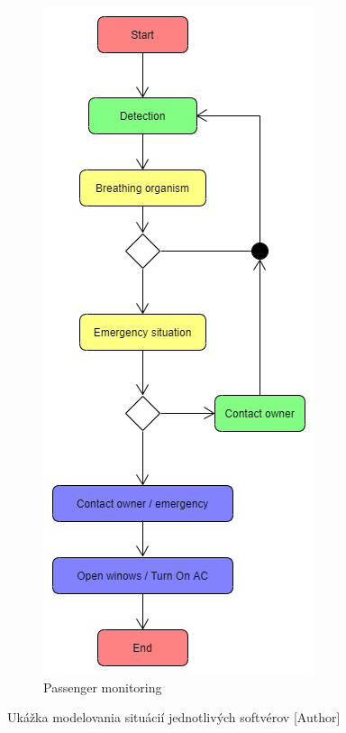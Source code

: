 \documentclass[10pt,oneside,slovak,a4paper]{article}
\begin{document}
\begin{figure} [H]
\begin{subfigure}{.35\textwidth}
  \includegraphics[width=1\linewidth]{AI_Radar}
  \caption{Passenger monitoring}
  \label{fig:sub2}
\end{subfigure}
\caption{Ukážka modelovania situácií jednotlivých softvérov [Author]}
\label{fig:test}
\end{figure}
\end{document}

